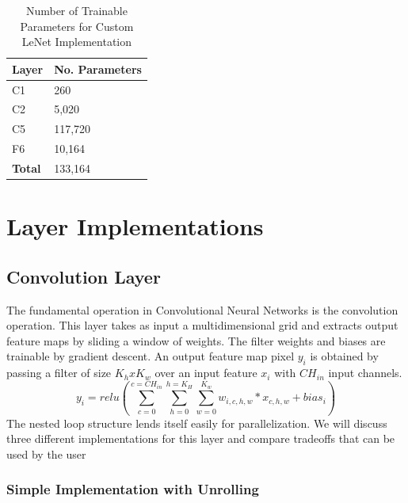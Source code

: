\begin{table}[]
\centering
\begin{tabular}{ll}
\hline
\multicolumn{1}{|l|}{\textbf{Layer}} & \multicolumn{1}{l|}{ \textbf{No. Parameters}} \\ \hline
\multicolumn{1}{|l|}{C1}    & \multicolumn{1}{l|}{260}                            \\ \hline
\multicolumn{1}{|l|}{C2}    & \multicolumn{1}{l|}{5,020}                          \\ \hline
\multicolumn{1}{|l|}{C5}    & \multicolumn{1}{l|}{117,720}                        \\ \hline
\multicolumn{1}{|l|}{F6}    & \multicolumn{1}{l|}{10,164}                        \\ \hline
\multicolumn{1}{|l|}{\textbf{Total}}    & \multicolumn{1}{l|}{133,164}                        \\ \hline
\end{tabular}
\label{tab:custom-lenet}        
\caption{Number of Trainable Parameters for Custom LeNet Implementation}             
\end{table}


\section{Layer Implementations}

\subsection{Convolution Layer}

The fundamental operation in Convolutional Neural Networks is the convolution operation. This layer takes as input a multidimensional grid and extracts output feature maps by sliding a window of weights. The filter weights and biases are trainable by gradient descent. An output feature map pixel $ \mathit{y_{i}} $ is obtained by passing a filter of size $ K_{h}xK_{w} $ over an input feature $ \mathit{x_{i}} $ with $ \mathit{CH_{in}} $ input channels.
\begin{equation}
 y_{i} = relu(\sum_{c=0}^{c=CH_{in}} \sum_{h=0}^{h=K_{H}} \sum_{w=0}^{K_{w}} w_{i,c,h,w} * x_{c,h,w}  + bias_i ) 
\label{eqn:summat}
\end{equation}
The nested loop structure lends itself easily for parallelization.  We will discuss three different implementations for this layer and compare tradeoffs that can be used by the user 

\subsubsection{Simple Implementation with Unrolling} \label{simpleimpl}

